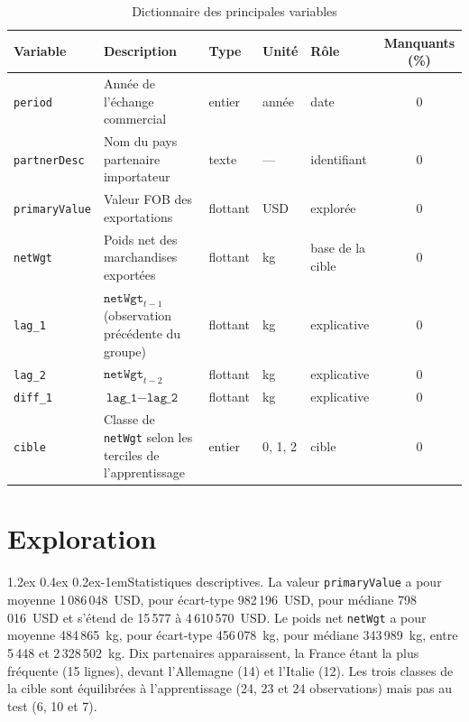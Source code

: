 \documentclass[11pt,a4paper]{article}
\makeatletter
\renewcommand\paragraph{\@startsection{paragraph}{4}{\z@}%
  {1.2ex \@plus 0.4ex \@minus 0.2ex}{-1em}{\normalfont\normalsize\bfseries}}
\makeatother
\begin{document}
\begin{table}[htbp]
  \centering
  \caption{Dictionnaire des principales variables}
  \label{tab:dictionnaire}
  \small
  \begin{tabular}{@{}l P{5.6cm} l l l c@{}}
    \toprule
    Variable & Description & Type & Unité & Rôle & Manquants (\%) \\
    \midrule
    \texttt{period} & Année de l'échange commercial & entier & année & date & 0 \\
    \texttt{partnerDesc} & Nom du pays partenaire importateur & texte & --- & identifiant & 0 \\
    \texttt{primaryValue} & Valeur FOB des exportations & flottant & USD & explorée & 0 \\
    \texttt{netWgt} & Poids net des marchandises exportées & flottant & kg & base de la cible & 0 \\
    \texttt{lag\_1} & $\texttt{netWgt}_{t-1}$ (observation précédente du groupe) & flottant & kg & explicative & 0 \\
    \texttt{lag\_2} & $\texttt{netWgt}_{t-2}$ & flottant & kg & explicative & 0 \\
    \texttt{diff\_1} & $\texttt{lag\_1} - \texttt{lag\_2}$ & flottant & kg & explicative & 0 \\
    \texttt{cible} & Classe de \texttt{netWgt} selon les terciles de l'apprentissage & entier & 0, 1, 2 & cible & 0 \\
    \bottomrule
  \end{tabular}
\end{table}

\section{Exploration}
\label{sec:exploration}
\paragraph{Statistiques descriptives.} La valeur \texttt{primaryValue} a pour moyenne 1\,086\,048~USD, pour écart-type 982\,196~USD, pour médiane 798\,016~USD et s'étend de 15\,577 à 4\,610\,570~USD. Le poids net \texttt{netWgt} a pour moyenne 484\,865~kg, pour écart-type 456\,078~kg, pour médiane 343\,989~kg, entre 5\,448 et 2\,328\,502~kg. Dix partenaires apparaissent, la France étant la plus fréquente (15 lignes), devant l'Allemagne (14) et l'Italie (12). Les trois classes de la cible sont équilibrées à l'apprentissage (24, 23 et 24 observations) mais pas au test (6, 10 et 7).
\end{document}
